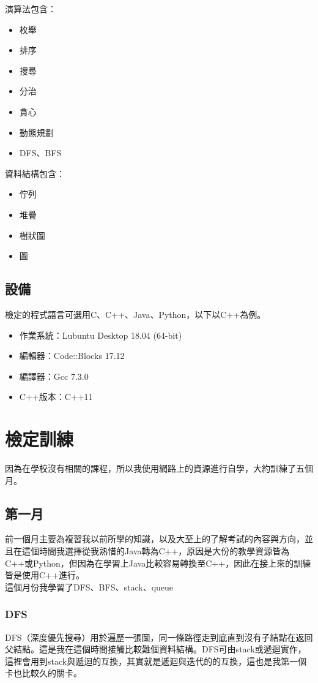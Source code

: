 \documentclass[a4paper, 18pt]{article}
\begin{document}
\noindent 演算法包含：
\begin{itemize}
    \item 枚舉
    \item 排序
    \item 搜尋
    \item 分治
    \item 貪心
    \item 動態規劃
    \item DFS、BFS
\end{itemize}

\noindent 資料結構包含：
\begin{itemize}
    \item 佇列
    \item 堆疊
    \item 樹狀圖
    \item 圖
\end{itemize}

\subsection{設備}
檢定的程式語言可選用C、C++、Java、Python，以下以C++為例。
\begin{itemize}
    \item 作業系統：Lubuntu Desktop 18.04 (64-bit)
    \item 編輯器：Code::Blocks 17.12
    \item 編譯器：Gcc 7.3.0
    \item C++版本：C++11
\end{itemize}

\section{檢定訓練}
因為在學校沒有相關的課程，所以我使用網路上的資源進行自學，大約訓練了五個月。
\subsection{第一月}
前一個月主要為複習我以前所學的知識，以及大至上的了解考試的內容與方向，並且在這個時間我選擇從我熟惜的Java轉為C++，原因是大份的教學資源皆為C++或Python，但因為在學習上Java比較容易轉換至C++，因此在接上來的訓練皆是使用C++進行。\\
這個月份我學習了DFS、BFS、stack、queue
\subsubsection{DFS}
DFS（深度優先搜尋）用於遍歷一張圖，同一條路徑走到底直到沒有子結點在返回父結點。這是我在這個時間接觸比較難個資料結構。DFS可由stack或遞迴實作，這裡會用到stack與遞迴的互換，其實就是遞迴與迭代的的互換，這也是我第一個卡也比較久的關卡。
\end{document}
